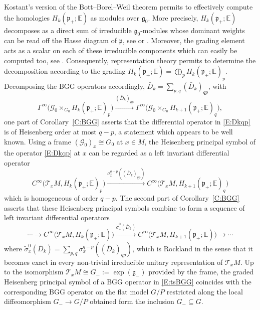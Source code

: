 \documentclass[reqno,12pt]{amsart}
\newcommand\goe{\mathfrak g}
\newcommand\poe{\mathfrak p}
\theoremstyle{plain}
\theoremstyle{definition}
\begin{document}
Kostant's version of the Bott--Borel--Weil theorem permits to effectively compute the homologies $H_k(\poe_+;\mathbb E)$ as modules over $\goe_0$.
More precisely, $H_k(\poe_+;\mathbb E)$ decomposes as a direct sum of irreducible $\goe_0$-modules whose dominant weights can be read off the Hasse diagram of $\poe$, see \cite{K61} or \cite[Theorem~3.3.5 and Proposition~3.3.6]{CS09}.
Moreover, the grading element acts as a scalar on each of these irreducible components which can easily be computed too, see \cite[Section~3.2.12]{CS09}.
Consequently, representation theory permits to determine the decomposition according to the grading $H_k(\poe_+;\mathbb E)=\bigoplus_pH_k(\poe_+;\mathbb E)_p$.
Decomposing the BGG operators accordingly, $\bar D_k=\sum_{p,q}(\bar D_k)_{qp}$, with
\begin{equation}\label{E:Dkqp}
\Gamma^\infty\bigl(\mathcal G_0\times_{G_0}H_k(\poe_+;\mathbb E)_p\bigr)
\xrightarrow{(\bar D_k)_{qp}}
\Gamma^\infty\bigl(\mathcal G_0\times_{G_0}H_{k+1}(\poe_+;\mathbb E)_q\bigr),
\end{equation}
one part of Corollary~\ref{C:BGG} asserts that the differential operator in \eqref{E:Dkqp} is of Heisenberg order at most $q-p$, a statement which appears to be well known.
Using a frame $(\mathcal G_0)_x\cong G_0$ at $x\in M$, the Heisenberg principal symbol of the operator \eqref{E:Dkqp} at $x$ can be regarded as a left invariant differential operator
$$
C^\infty\bigl(\mathcal T_xM,H_k(\poe_+;\mathbb E)_p\bigr)\xrightarrow{\sigma^{q-p}_x((\bar D_k)_{qp})}C^\infty\bigl(\mathcal T_xM,H_{k+1}(\poe_+;\mathbb E)_q\bigr)
$$
which is homogeneous of order $q-p$.
The second part of Corollary~\ref{C:BGG} asserts that these Heisenberg principal symbols combine to form a sequence of left invariant differential operators
\begin{equation}\label{E:tsBGG}
\cdots\to C^\infty\bigl(\mathcal T_xM,H_k(\poe_+;\mathbb E)\bigr)
\xrightarrow{\tilde\sigma^0_x(\bar D_k)}
C^\infty\bigl(\mathcal T_xM,H_{k+1}(\poe_+;\mathbb E)\bigr)\to\cdots
\end{equation}
where $\tilde\sigma_x^0(\bar D_k)=\sum_{p,q}\sigma^{q-p}_x((\bar D_k)_{qp})$, which is Rockland in the sense that it becomes exact in every non-trivial irreducible unitary representation of $\mathcal T_xM$.
Up to the isomorphism $\mathcal T_xM\cong G_-:=\exp(\goe_-)$ provided by the frame, the graded Heisenberg principal symbol of a BGG operator in \eqref{E:tsBGG} coincides with the corresponding BGG operator on the flat model $G/P$ restricted along the local diffeomorphism $G_-\to G/P$ obtained form the inclusion $G_-\subseteq G$.
\end{document}
